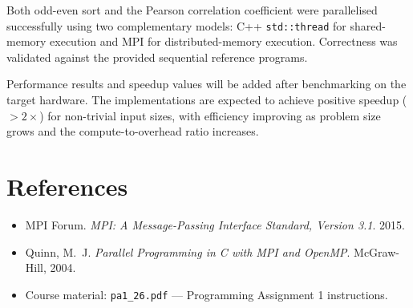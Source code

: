 \documentclass[11pt,a4paper]{article}
\begin{document}
Both odd-even sort and the Pearson correlation coefficient were parallelised successfully using
two complementary models: C++ \texttt{std::thread} for shared-memory execution and MPI for
distributed-memory execution. Correctness was validated against the provided sequential
reference programs.

Performance results and speedup values will be added after benchmarking on the target hardware.
The implementations are expected to achieve positive speedup ($>2\times$) for non-trivial input
sizes, with efficiency improving as problem size grows and the compute-to-overhead ratio
increases.

\section*{References}

\begin{itemize}
    \item MPI Forum. \textit{MPI: A Message-Passing Interface Standard, Version 3.1}. 2015.
    \item Quinn, M.~J. \textit{Parallel Programming in C with MPI and OpenMP}. McGraw-Hill, 2004.
    \item Course material: \texttt{pa1\_26.pdf} --- Programming Assignment 1 instructions.
\end{itemize}
\end{document}

